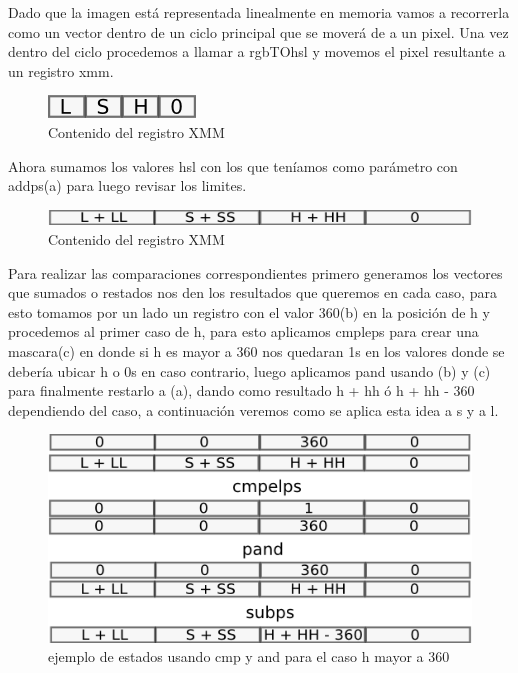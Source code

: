 \documentclass[a4paper]{article}
\begin{document}
Dado que la imagen está representada linealmente en memoria vamos a recorrerla como un vector dentro de un ciclo principal que se moverá de a un pixel. Una vez dentro del ciclo procedemos a llamar a rgbTOhsl y movemos el pixel resultante a un registro xmm.

\begin{figure}[H]
\centering
\includegraphics[scale=0.8]{imagenes/lsh.png}
\caption{Contenido del registro XMM}
\label{lshValue5}
\end{figure}

Ahora sumamos los valores hsl con los que teníamos como parámetro con addps(a) para luego revisar los limites.

\begin{figure}[H]
\centering
\includegraphics[scale=0.8]{imagenes/sumahsl.png}
\caption{Contenido del registro XMM}
\label{lshValue4}
\end{figure}

Para realizar las comparaciones correspondientes primero generamos los vectores que sumados o restados nos den los resultados que queremos en cada caso, para esto tomamos por un lado un registro con el valor 360(b) en la posición de h y procedemos al primer caso de h, para esto aplicamos cmpleps para crear una mascara(c) en donde si h es mayor a 360 nos quedaran 1s en los valores donde se debería ubicar h o 0s en caso contrario, luego aplicamos pand usando (b) y (c) para finalmente restarlo a (a), dando como resultado h + hh ó h + hh - 360 dependiendo del caso, a continuación veremos como se aplica esta idea a s y a l.

\begin{figure}[H]
\centering
\includegraphics[scale=0.8]{imagenes/caso1hsumahsl.png}
\caption{ejemplo de estados usando cmp y and para el caso h mayor a 360}
\label{lshValue3}
\end{figure}
\end{document}
